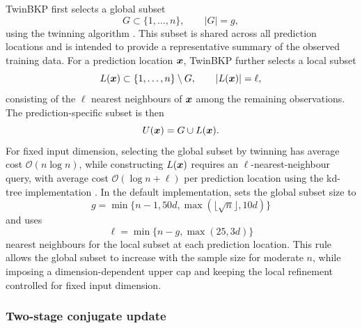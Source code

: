 \documentclass[article, shortnames]{jss}
\renewcommand{\vec}[1]{\mbox{\boldmath ${#1}$}}
\begin{document}
TwinBKP first selects a global subset
\[
G \subset \{1,\ldots,n\}, \qquad |G|=g,
\]
using the twinning algorithm \citep{Vakayil2022Twinning}. 
This subset is shared across all prediction locations and is intended to provide a representative summary of the observed training data. 
For a prediction location $\vec{x}$, TwinBKP further selects a local subset
\[
L(\vec{x}) \subset \{1,\ldots,n\}\setminus G, \qquad |L(\vec{x})|=\ell,
\]
consisting of the $\ell$ nearest neighbours of $\vec{x}$ among the remaining observations. 
The prediction-specific subset is then
\[
U(\vec{x}) = G\cup L(\vec{x}).
\] 
For fixed input dimension, selecting the global subset by twinning has average cost $\mathcal{O}(n\log n)$, while constructing $L(\vec{x})$ requires an $\ell$-nearest-neighbour query, with average cost $\mathcal{O}(\log n+\ell)$ per prediction location using the  kd-tree implementation \citep{Blanco2014nanoflann}.
In the default implementation,  sets the global subset size to 
\[
g=\min\{n-1,50d,\max(\lfloor\sqrt{n}\rfloor,10d)\}
\]
and uses 
\[
\ell=\min\{n-g,\max(25,3d)\}
\]
nearest neighbours for the local subset at each prediction location. 
This rule allows the global subset to increase with the sample size for moderate $n$, while imposing a dimension-dependent upper cap and keeping the local refinement controlled for fixed input dimension.

\subsubsection{Two-stage conjugate update}
\end{document}
